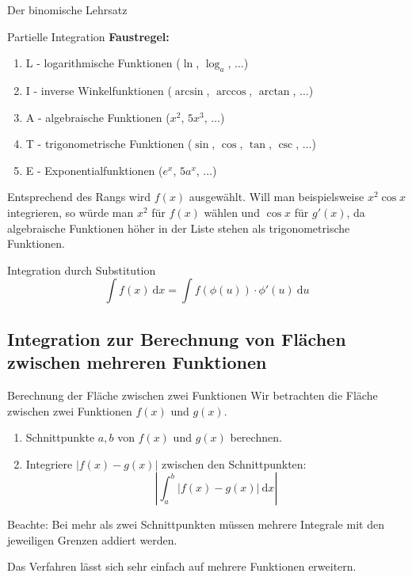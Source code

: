 \documentclass[german]{spicker}
\renewcommand{\abs}[1]{\left| #1 \right|}
\newcommand{\dx}{~\mathrm{d}x}
\newcommand{\du}{~\mathrm{d}u}
\begin{document}
\begin{defi}{Der binomische Lehrsatz}
\begin{bonus}{Partielle Integration}
    \textbf{Faustregel:}
    \begin{enumerate}
        \item L - logarithmische Funktionen ($\ln$, $\log_a$, $\ldots$)
        \item I - inverse Winkelfunktionen ($\arcsin$, $\arccos$, $\arctan$, $\ldots$)
        \item A - algebraische Funktionen ($x^2$, $5x^3$, $\ldots$)
        \item T - trigonometrische Funktionen ($\sin$, $\cos$, $\tan$, $\csc$, $\ldots$)
        \item E - Exponentialfunktionen ($e^x$, $5a^x$, $\ldots$)
    \end{enumerate}
    Entsprechend des Rangs wird $f(x)$ ausgewählt. Will man beispielsweise $x^2\cos x$ integrieren, so würde man $x^2$ für $f(x)$ wählen und $\cos x$ für $g'(x)$, da algebraische Funktionen höher in der Liste stehen als trigonometrische Funktionen.
\end{bonus}

\begin{bonus}{Integration durch Substitution}
    $$
        \int f(x)\dx = \int f(\phi(u)) \cdot \phi'(u) \du
    $$
\end{bonus}

\subsection{Integration zur Berechnung von Flächen zwischen mehreren Funktionen}

\begin{algo}{Berechnung der Fläche zwischen zwei Funktionen}
    Wir betrachten die Fläche zwischen zwei Funktionen $f(x)$ und $g(x)$.

    \begin{enumerate}
        \item Schnittpunkte $a, b$ von $f(x)$ und $g(x)$ berechnen.
        \item Integriere $\abs{f(x) - g(x)}$ zwischen den Schnittpunkten:
              $$
                  \abs{\int^b_a\abs{f(x) -g(x)} \dx}
              $$
    \end{enumerate}

    Beachte: Bei mehr als zwei Schnittpunkten müssen mehrere Integrale mit den jeweiligen Grenzen addiert werden.

    Das Verfahren lässt sich sehr einfach auf mehrere Funktionen erweitern.
\end{algo}


\end{defi}
\end{document}
